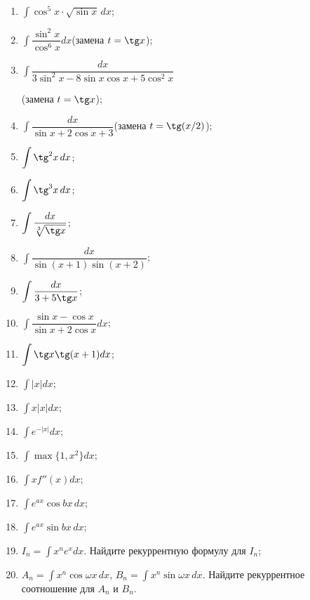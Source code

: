 \documentclass[12pt]{article}
\newcommand{\dint}{\displaystyle\int}
\begin{document}
\begin{enumerate}
		\item $\dint \cos^5 x\cdot \sqrt{\sin x}\,dx$;
		\item $\dint \dfrac{\sin^2 x}{\cos^6 x}dx$\quad (замена $t=\tg x$);
		\item $\dint \dfrac{dx}{3\sin^2x-8\sin x\cos x+5\cos^2 x}$
		
		\vspace{1mm} (замена $t=\tg x$);
		\item $\dint \dfrac{dx}{\sin x+2\cos x+3}$\quad (замена $t=\tg (x/2)$);
		\item $\dint \tg^2 x\,dx$;
		\item $\dint \tg^3 x\,dx$;
		\item $\dint \dfrac{dx}{\sqrt[3]{\tg x}}$;
		\item $\dint \dfrac{dx}{\sin(x+1)\sin(x+2)}$;
		\item $\dint \dfrac{dx}{3+5\tg x}$;
		\item $\dint \dfrac{\sin x-\cos x}{\sin x+2\cos x}dx$;
		\item $\dint \tg x\tg(x+1)dx$;
		\item $\dint |x|dx$;
		\item $\dint x|x|dx$;
		\item $\dint e^{-|x|}dx$;
		\item $\dint \max\{1,x^2\}dx$;
		\item $\dint xf''(x)dx$;
		\item $\dint e^{ax}\cos bx\,dx$;
		\item $\dint e^{ax}\sin bx\,dx$;
		\item $I_n=\dint x^ne ^x dx$. Найдите рекуррентную формулу для $I_n$; 
		\item $A_n=\dint x^n\cos\omega x\,dx$, $B_n=\dint x^n\sin\omega x\,dx$. Найдите рекуррентное соотношение для $A_n$ и $B_n$.
	\end{enumerate}
\end{document}

